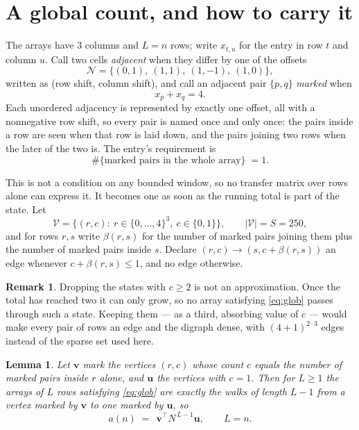 \documentclass[11pt,a4paper]{article}
\theoremstyle{plain}
\newtheorem{lemma}[theorem]{Lemma}
\theoremstyle{definition}
\newtheorem{remark}[theorem]{Remark}
\begin{document}
\section{A global count, and how to carry it}

The arrays have $3$ columns and $L=n$ rows; write $x_{t,u}$ for the entry in
row $t$ and column $u$. Call two cells \emph{adjacent} when they differ by one of the
offsets
\[
\mathcal N=\{(0,1),\ (1,1),\ (1,-1),\ (1,0)\},
\]
written as (row shift, column shift), and call an adjacent pair $\{p,q\}$
\emph{marked} when
\[
x_{p}+x_{q}=4 .
\]
Each unordered adjacency is represented by exactly one offset, all with a nonnegative row
shift, so every pair is named once and only once: the pairs inside a row are seen when
that row is laid down, and the pairs joining two rows when the later of the two is. The
entry's requirement is
\begin{equation}\label{eq:glob}
\#\{\text{marked pairs in the whole array}\}\;=1.
\end{equation}

This is not a condition on any bounded window, so no transfer matrix over rows alone can
express it. It becomes one as soon as the running total is part of the state. Let
\[
\mathcal V=\bigl\{(r,c):\ r\in\{0,\dots,4\}^{3},\ c\in\{0,1\}\bigr\},
\qquad |\mathcal V|=S=250,
\]
and for rows $r,s$ write $\beta(r,s)$ for the number of marked pairs joining them plus the
number of marked pairs inside $s$. Declare $(r,c)\to(s,c+\beta(r,s))$ an edge whenever
$c+\beta(r,s)\le1$, and no edge otherwise.

\begin{remark}
Dropping the states with $c\ge2$ is not an approximation. Once the total has reached two it
can only grow, so no array satisfying \eqref{eq:glob} passes through such a state. Keeping
them --- as a third, absorbing value of $c$ --- would make every pair of rows an edge and
the digraph dense, with $(4+1)^{2\cdot3}$ edges instead of the sparse set used here.
\end{remark}

\begin{lemma}\label{lem:walk}
Let $\mathbf{v}$ mark the vertices $(r,c)$ whose count $c$ equals the number of marked pairs
inside $r$ alone, and $\mathbf{u}$ the vertices with $c=1$. Then for $L\ge1$ the arrays
of $L$ rows satisfying \eqref{eq:glob} are exactly the walks of length $L-1$ from a
vertex marked by $\mathbf{v}$ to one marked by $\mathbf{u}$, so
\[
a(n)\;=\;\,\mathbf{v}^{\!\top}N^{\,L-1}\mathbf{u},\qquad L=n .
\]
\end{lemma}
\end{document}
